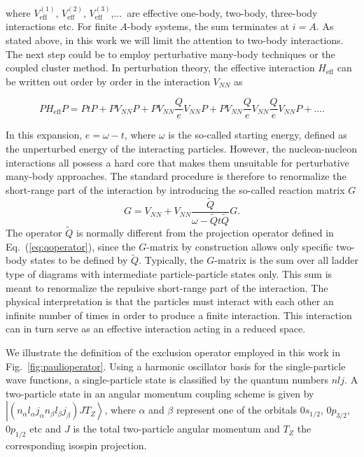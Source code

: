 \documentclass[aps,prc,twocolumn,floatfix]{revtex4}
\begin{document}
where $ V_{\mathrm{eff}}^{(1)}$,  $ V_{\mathrm{eff}}^{(2)}$,
 $ V_{\mathrm{eff}}^{(3)}$,...\ are effective one-body, two-body,
three-body interactions etc. For finite $A$-body systems, the sum terminates
at $i=A$. As stated above, in this work we will limit the
attention to two-body interactions.
The next step could be to employ perturbative many-body techniques 
or the coupled 
cluster method.
In  perturbation theory, the effective interaction
$H_{\mathrm{eff}}$ can be written out order by order in the 
interaction $V_{NN}$ as
\begin{widetext}
\begin{equation}
               PH_{\mathrm{eff}}P=PtP+PV_{NN}P +PV_{NN}\frac{Q}{e}V_{NN} P+
               PV_{NN}\frac{Q}{e}V_{NN} \frac{Q}{e}V_{NN} P+\dots.
               \label{eq:effint}
\end{equation}
\end{widetext}
In this expansion, $e=\omega -t$,
where $\omega$ is the so-called starting energy, defined as the unperturbed
energy of the interacting particles.
However, 
the nucleon-nucleon interactions all possess a hard core that 
makes them unsuitable for perturbative many-body approaches. The
standard procedure is therefore to  renormalize the short-range part of the 
interaction by introducing the so-called reaction matrix $G$
\begin{equation}
G=V_{NN}+V_{NN}\frac{\tilde{Q}}{\omega - \tilde{Q}t\tilde{Q}}G.
\label{eq:gfinite}
\end{equation}
The operator $\tilde{Q}$ is normally different from the 
projection operator defined in Eq.~(\ref{eq:qoperator}), 
since the $G$-matrix by construction 
allows only specific two-body states to be defined by $\tilde{Q}$.
Typically,  
the $G$-matrix is the sum over all
ladder type of diagrams with intermediate particle-particle states
only. This sum is meant to renormalize
the repulsive short-range part of the interaction. The physical interpretation
is that the particles must interact with each other an infinite number
of times in order to produce a finite interaction. This interaction can in turn
serve as an effective interaction acting in a reduced space. 

We illustrate the definition of the exclusion operator employed in this
work in Fig.~\ref{fig:paulioperator}. 
Using a harmonic oscillator basis for the single-particle wave functions,
a single-particle state is classified by the quantum numbers $nlj$.
A two-particle state in an angular momentum coupling scheme is given by
$\left| (n_{\alpha}l_{\alpha}j_{\alpha}n_{\beta}l_{\beta}j_{\beta})JT_Z\right \rangle$, where $\alpha$ and $\beta$ represent one of the orbitals 
$0s_{1/2}$, $0p_{3/2}$, $0p_{1/2}$ etc and $J$ is the total two-particle
angular momentum and $T_Z$ the corresponding isospin projection.
\end{document}
